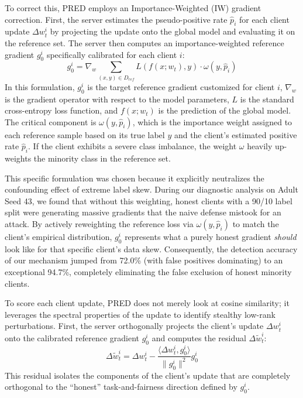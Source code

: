 \documentclass[journal]{IEEEtran}
\begin{document}
To correct this, PRED employs an Importance-Weighted (IW) gradient correction. First, the server estimates the pseudo-positive rate $\hat{p}_i$ for each client update $\Delta w_t^i$ by projecting the update onto the global model and evaluating it on the reference set. The server then computes an importance-weighted reference gradient $g_0^i$ specifically calibrated for each client $i$:
\begin{equation}
g_0^i = \nabla_{w} \sum_{(x,y) \in D_{ref}} L(f(x; w_t), y) \cdot \omega(y, \hat{p}_i)
\end{equation}
In this formulation, $g_0^i$ is the target reference gradient customized for client $i$, $\nabla_{w}$ is the gradient operator with respect to the model parameters, $L$ is the standard cross-entropy loss function, and $f(x; w_t)$ is the prediction of the global model. The critical component is $\omega(y, \hat{p}_i)$, which is the importance weight assigned to each reference sample based on its true label $y$ and the client's estimated positive rate $\hat{p}_i$. If the client exhibits a severe class imbalance, the weight $\omega$ heavily up-weights the minority class in the reference set.

This specific formulation was chosen because it explicitly neutralizes the confounding effect of extreme label skew. During our diagnostic analysis on Adult Seed 43, we found that without this weighting, honest clients with a 90/10 label split were generating massive gradients that the naive defense mistook for an attack. By actively reweighting the reference loss via $\omega(y, \hat{p}_i)$ to match the client's empirical distribution, $g_0^i$ represents what a purely honest gradient \textit{should} look like for that specific client's data skew. Consequently, the detection accuracy of our mechanism jumped from 72.0\% (with false positives dominating) to an exceptional 94.7\%, completely eliminating the false exclusion of honest minority clients.

To score each client update, PRED does not merely look at cosine similarity; it leverages the spectral properties of the update to identify stealthy low-rank perturbations. First, the server orthogonally projects the client's update $\Delta w_t^i$ onto the calibrated reference gradient $g_0^i$ and computes the residual $\Delta \tilde{w}_t^i$:
\begin{equation}
\Delta \tilde{w}_t^i = \Delta w_t^i - \frac{\langle \Delta w_t^i, g_0^i \rangle}{\| g_0^i \|^2} g_0^i
\end{equation}
This residual isolates the components of the client's update that are completely orthogonal to the ``honest'' task-and-fairness direction defined by $g_0^i$. 
\end{document}
